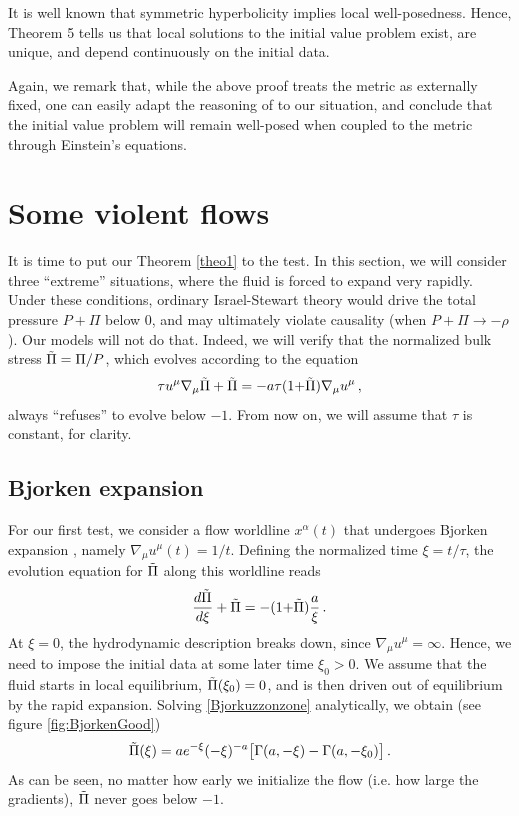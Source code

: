 \documentclass[a4paper, amsfonts, amssymb, amsmath, reprint, showkeys, nofootinbib, twoside,notitlepage,onecolumn]{revtex4-2}
\theoremstyle{definition}
\theoremstyle{theorem}
\theoremstyle{corollary}
\begin{document}
It is well known that symmetric hyperbolicity implies local well-posedness. Hence, Theorem 5 tells us that local solutions to the initial value problem exist, are unique, and depend continuously on the initial data. 

Again, we remark that, while the above proof treats the metric as externally fixed, one can easily adapt the reasoning of \cite{Causality_bulk} to our situation, and conclude that the initial value problem will remain well-posed when coupled to the metric through Einstein's equations.


\section{Some violent flows}

It is time to put our Theorem \ref{theo1} to the test. In this section, we will consider three ``extreme'' situations, where the fluid is forced to expand very rapidly. Under these conditions, ordinary Israel-Stewart theory would drive the total pressure $P+\Pi$ below $0$, and may ultimately violate causality (when $P+\Pi \rightarrow -\rho$). Our models will not do that. Indeed, we will verify that the normalized bulk stress $\Tilde{\Pi}=\Pi/P$, which evolves according to the equation 
\begin{equation}
\tau u^\mu \nabla_\mu \Tilde{\Pi} +\Tilde{\Pi}=- a \tau(1{+}\Tilde{\Pi}) \nabla_\mu u^\mu \, ,
\end{equation}
always ``refuses'' to evolve below $-1$. 
From now on, we will assume that $\tau$ is constant, for clarity.

\vspace{-0.3cm}
\subsection{Bjorken expansion}
\vspace{-0.2cm}

For our first test, we consider a flow worldline $x^\alpha(t)$ that undergoes Bjorken expansion \cite{BjorkenFlow1983}, namely $\nabla_\mu u^\mu(t) =1/t$. Defining the normalized time $\xi=t/\tau$, the evolution equation for $\Tilde{\Pi}$ along this worldline reads
\begin{equation}\label{Bjorkuzzonzone}
\dfrac{d \Tilde{\Pi}}{d\xi}+\Tilde{\Pi}=-(1{+}\Tilde{\Pi}) \dfrac{a}{\xi} \, .
\end{equation}
At $\xi=0$, the hydrodynamic description breaks down, since $\nabla_\mu u^\mu =\infty$. Hence, we need to impose the initial data at some later time $\xi_0>0$. We assume that the fluid starts in local equilibrium, $\Tilde{\Pi}(\xi_0)=0$, and is then driven out of equilibrium by the rapid expansion. Solving \eqref{Bjorkuzzonzone} analytically, we obtain (see figure \ref{fig:BjorkenGood})
\begin{equation}\label{grione}
\Tilde{\Pi}(\xi)=ae^{-\xi} (-\xi)^{-a} \big[\Gamma(a,-\xi)-\Gamma(a,-\xi_0) \big] \, .
\end{equation}
As can be seen, no matter how early we initialize the flow (i.e. how large the gradients), $\Tilde{\Pi}$ never goes below $-1$.
\end{document}
